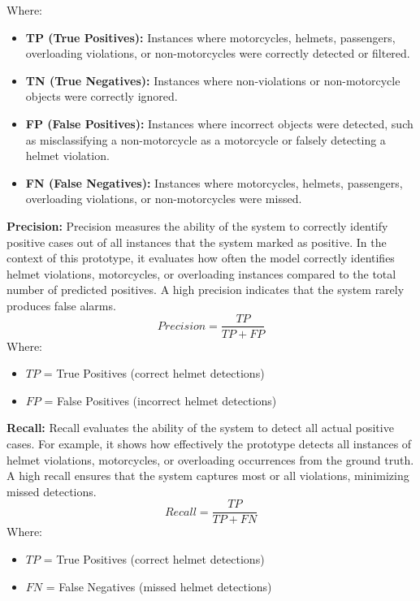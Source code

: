 \begin{refsection}
Where:
\begin{itemize}
    \item \textbf{TP (True Positives):} Instances where motorcycles, helmets, passengers, overloading violations, or non-motorcycles were correctly detected or filtered.

    \item \textbf{TN (True Negatives):} Instances where non-violations or non-motorcycle objects were correctly ignored.

    \item \textbf{FP (False Positives):} Instances where incorrect objects were detected, such as misclassifying a non-motorcycle as a motorcycle or falsely detecting a helmet violation.

    \item \textbf{FN (False Negatives):} Instances where motorcycles, helmets, passengers, overloading violations, or non-motorcycles were missed.
\end{itemize}



    \item \textbf{Precision:}  Precision measures the ability of the system to correctly identify positive cases out of all instances that the system marked as positive. In the context of this prototype, it evaluates how often the model correctly identifies helmet violations, motorcycles, or overloading instances compared to the total number of predicted positives. A high precision indicates that the system rarely produces false alarms.
    \begin{equation}
        Precision = \frac{TP}{TP + FP}
        \label{eq:precision}
    \end{equation}
    Where:
    \begin{itemize}
        \item $TP$ = True Positives (correct helmet detections)
        \item $FP$ = False Positives (incorrect helmet detections)
    \end{itemize}


    \item \textbf{Recall:}  Recall evaluates the ability of the system to detect all actual positive cases. For example, it shows how effectively the prototype detects all instances of helmet violations, motorcycles, or overloading occurrences from the ground truth. A high recall ensures that the system captures most or all violations, minimizing missed detections.
    \begin{equation}
        Recall = \frac{TP}{TP + FN}
        \label{eq:recall}
    \end{equation}
    Where:
    \begin{itemize}
        \item $TP$ = True Positives (correct helmet detections)
        \item $FN$ = False Negatives (missed helmet detections)
    \end{itemize}



\end{refsection}
